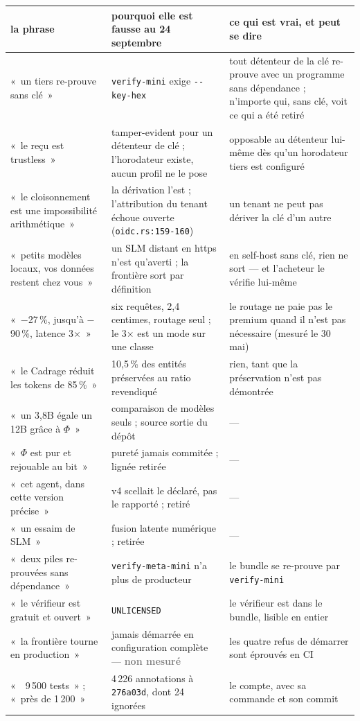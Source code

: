 \documentclass[10pt]{article}
\newcommand{\code}[1]{\texttt{\small #1}}
\newcommand{\loc}[1]{{\footnotesize\color{grey}\texttt{#1}}}
\newcommand{\nm}[1]{\textcolor{grey}{\textbf{#1}}}
\newcommand{\x}{$\times$}
\newcommand{\pc}{\,\%}
\begin{document}
{\small
\renewcommand{\arraystretch}{1.18}
\begin{longtable}{@{}L{4.5cm}L{6.3cm}L{6.2cm}@{}}
\toprule
\textbf{la phrase} & \textbf{pourquoi elle est fausse au 24 septembre} & \textbf{ce qui est vrai, et peut se dire} \\ \midrule \endhead
«~un tiers re-prouve sans clé~» & \code{verify-mini} exige \code{-{}-key-hex} & tout détenteur de la clé re-prouve avec un programme sans dépendance ; n'importe qui, sans clé, voit ce qui a été retiré \\
«~le reçu est trustless~» & tamper-evident pour un détenteur de clé ; l'horodateur existe, aucun profil ne le pose & opposable au détenteur lui-même dès qu'un horodateur tiers est configuré \\
«~le cloisonnement est une impossibilité arithmétique~» & la dérivation l'est ; l'attribution du tenant échoue ouverte (\loc{oidc.rs:159-160}) & un tenant ne peut pas dériver la clé d'un autre \\
«~petits modèles locaux, vos données restent chez vous~» & un SLM distant en https n'est qu'averti ; la frontière sort par définition & en self-host sans clé, rien ne sort --- et l'acheteur le vérifie lui-même \\
«~$-$27\pc{}, jusqu'à $-$90\pc{}, latence 3\x{}~» & six requêtes, 2,4 centimes, routage seul ; le 3\x{} est un mode sur une classe & le routage ne paie pas le premium quand il n'est pas nécessaire (mesuré le 30 mai) \\
«~le Cadrage réduit les tokens de 85\pc{}~» & 10,5\pc{} des entités préservées au ratio revendiqué & rien, tant que la préservation n'est pas démontrée \\
«~un 3,8B égale un 12B grâce à $\Phi$~» & comparaison de modèles seuls ; source sortie du dépôt & --- \\
«~$\Phi$ est pur et rejouable au bit~» & pureté jamais commitée ; lignée retirée & --- \\
«~cet agent, dans cette version précise~» & v4 scellait le déclaré, pas le rapporté ; retiré & --- \\
«~un essaim de SLM~» & fusion latente numérique ; retirée & --- \\
«~deux piles re-prouvées sans dépendance~» & \code{verify-meta-mini} n'a plus de producteur & le bundle se re-prouve par \code{verify-mini} \\
«~le vérifieur est gratuit et ouvert~» & \code{UNLICENSED} & le vérifieur est dans le bundle, lisible en entier \\
«~la frontière tourne en production~» & jamais démarrée en configuration complète --- \nm{non mesuré} & les quatre refus de démarrer sont éprouvés en CI \\
«~~9\,500 tests~» ; «~près de 1\,200~» & 4\,226 annotations à \code{276a03d}, dont 24 ignorées & le compte, avec sa commande et son commit \\
\bottomrule
\end{longtable}
}
\end{document}
